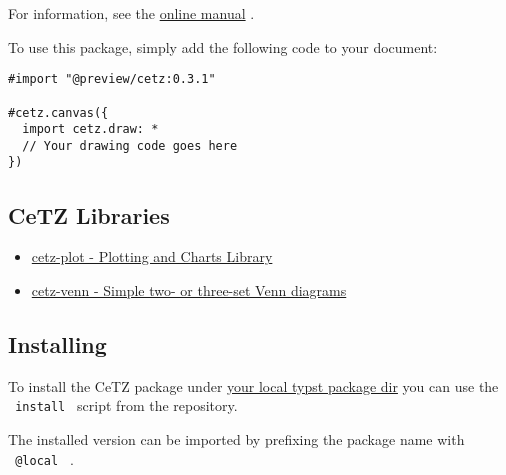 For information, see the
\href{https://cetz-package.github.io/docs}{online manual} .

To use this package, simply add the following code to your document:

\begin{verbatim}
#import "@preview/cetz:0.3.1"

#cetz.canvas({
  import cetz.draw: *
  // Your drawing code goes here
})
\end{verbatim}

\subsection{CeTZ Libraries}\label{cetz-libraries}

\begin{itemize}
\tightlist
\item
  \href{https://github.com/cetz-package/cetz-plot}{cetz-plot - Plotting
  and Charts Library}
\item
  \href{https://github.com/cetz-package/cetz-venn}{cetz-venn - Simple
  two- or three-set Venn diagrams}
\end{itemize}

\subsection{Installing}\label{installing}

To install the CeTZ package under
\href{https://github.com/typst/packages?tab=readme-ov-file\#local-packages}{your
local typst package dir} you can use the \texttt{\ install\ } script
from the repository.

\begin{Shaded}
\begin{Highlighting}[]
\end{Highlighting}
\end{Shaded}

The installed version can be imported by prefixing the package name with
\texttt{\ @local\ } .

\begin{Shaded}
\begin{Highlighting}[]

\NormalTok{\})}
\end{Highlighting}
\end{Shaded}

